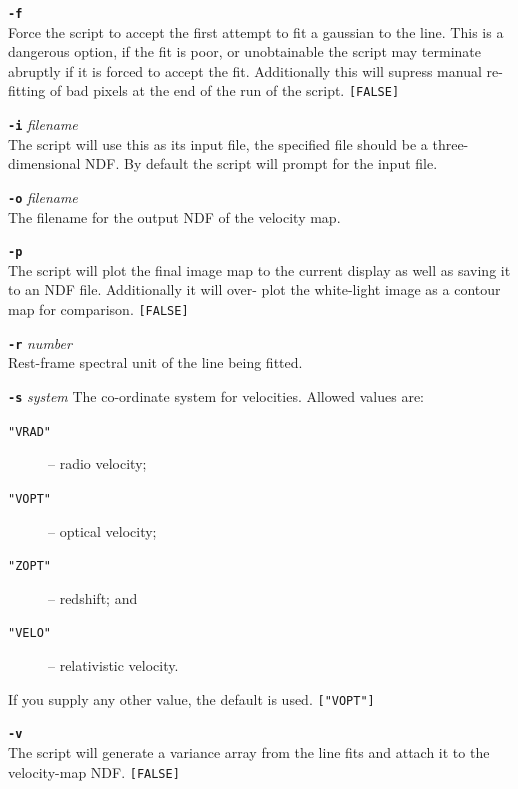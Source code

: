 \documentclass[twoside,11pt]{article}
\begin{document}
{{{         \sstitem
         {\bf{\tt{-f}}}\\
           Force the script to accept the first attempt to fit a gaussian to
           the line.  This is a dangerous option, if the fit is poor, or
           unobtainable the script may terminate abruptly if it is forced to
           accept the fit.  Additionally this will supress manual re-fitting
           of bad pixels at the end of the run of the script.  {\tt [FALSE]}

         \sstitem
         {\bf{\tt{-i}}} {\em filename}\\
           The script will use this as its input file, the specified file should
           be a three-dimensional NDF.  By default the script will prompt for the
           input file.

         \sstitem
         {\bf{\tt{-o}}} {\em filename}\\
           The filename for the output NDF of the velocity map.

         \sstitem
         {\bf{\tt{-p}}}\\
           The script will plot the final image map to the current display
           as well as saving it to an NDF file.  Additionally it will over-
           plot the white-light image as a contour map for comparison.
           {\tt [FALSE]}

         \sstitem
         {\bf{\tt{-r}}} {\em number}\\
           Rest-frame spectral unit of the line being fitted.

         \sstitem
         {\bf{\tt{-s}}} {\em system}
           The co-ordinate system for velocities.  Allowed values are:\\
           \begin{description}
           \item[{\tt "VRAD"}] -- radio velocity;
           \item[{\tt "VOPT"}] -- optical velocity;
           \item[{\tt "ZOPT"}] -- redshift; and
           \item[{\tt "VELO"}] -- relativistic velocity.
           \end{description}
           If you supply any other value, the default is used.  {\tt ["VOPT"]}

         \sstitem
         {\bf{\tt{-v}}}\\
           The script will generate a variance array from the line fits and
           attach it to the velocity-map NDF.  {\tt [FALSE]}

}}}
\end{document}
